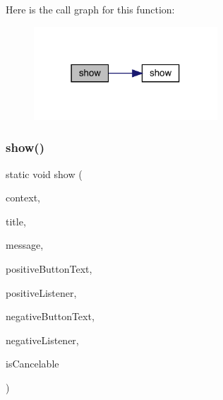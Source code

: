 Here is the call graph for this function\+:
\nopagebreak
\begin{figure}[H]
\begin{center}
\leavevmode
\includegraphics[width=195pt]{classcom_1_1toast_1_1android_1_1gamebase_1_1base_1_1ui_1_1_simple_alert_dialog_a19e406a26de22bbc95ff8cb38a20cdb8_cgraph}
\end{center}
\end{figure}
\mbox{\label{classcom_1_1toast_1_1android_1_1gamebase_1_1base_1_1ui_1_1_simple_alert_dialog_a497ac9cb638d7a7b3dc33cae5f7ff39c}} 
\subsubsection{\texorpdfstring{show()}{show()}\hspace{0.1cm}{\footnotesize\ttfamily [5/6]}}
{\footnotesize\ttfamily static void show (\begin{DoxyParamCaption}\item[{@Non\+Null final Context}]{context,  }\item[{@Non\+Null final String}]{title,  }\item[{@Non\+Null final String}]{message,  }\item[{@Nullable final String}]{positive\+Button\+Text,  }\item[{@Nullable final Dialog\+Interface.\+On\+Click\+Listener}]{positive\+Listener,  }\item[{@Nullable final String}]{negative\+Button\+Text,  }\item[{@Nullable final Dialog\+Interface.\+On\+Click\+Listener}]{negative\+Listener,  }\item[{final boolean}]{is\+Cancelable }\end{DoxyParamCaption})\hspace{0.3cm}{\ttfamily [static]}}

